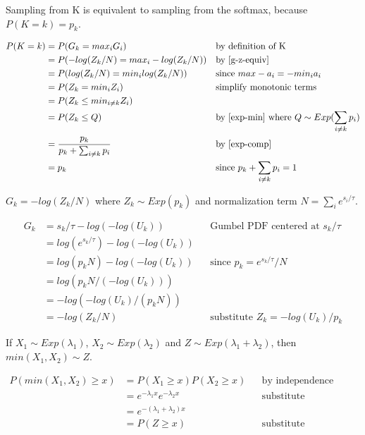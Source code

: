 \documentclass{article}
\begin{document}
\begin{theorem}
Sampling from K is equivalent to sampling from the softmax, because $P(K=k) = p_k$. \cite{Medina2020DuffAD}
\end{theorem}
\begin{align*}
    P(K = k) &= P(G_k = max_i G_i) &&\text{by definition of K} \\
    &= P(-log(Z_k / N) = max_i -log(Z_k / N)) &&\text{by \ref{g-z-equiv}}\\
    &= P(log(Z_k / N) = min_i log(Z_k / N)) &&\text{since } max -a_i = -min_i a_i \\
    &= P(Z_k = min_i Z_i) &&\text{simplify monotonic terms} \\
    &= P(Z_k \leq min_{i \neq k} Z_i) \\
    &= P(Z_k \leq Q) &&\text{by \ref{exp-min} where } Q \sim Exp(\sum_{i \neq k} p_i)\\
    &= \frac{p_k}{p_k + \sum_{i \neq k} p_i}  &&\text{by \ref{exp-comp}} \\
    &= p_k &&\text{since } p_k + \sum_{i \neq k} p_i = 1
\end{align*}


\begin{lemma}
\label{g-z-equiv}
$G_k = -log(Z_k / N)$ where $Z_k \sim Exp(p_k)$ and normalization term $N = \sum_i e^{s_i / \tau}$.
\end{lemma}
\begin{align*}
    G_k &= s_k / \tau - log(-log(U_k)) &&\text{Gumbel PDF centered at } s_k / \tau \\
    &= log(e^{s_k / \tau}) - log(-log(U_k)) \\
    &= log(p_k N) - log(-log(U_k)) &&\text{since } p_k = e^{s_k / \tau} / N \\
    &= log(p_k N / (-log(U_k))) \\
    &= -log(-log(U_k) / (p_k N)) \\
    &= -log(Z_k / N) &&\text{substitute $Z_k = -log(U_k) / p_k$}
\end{align*}

\begin{lemma}
\label{exp-min}
If $X_1 \sim Exp(\lambda_1)$, $X_2 \sim Exp(\lambda_2)$ and $Z \sim Exp(\lambda_1 + \lambda_2)$, then $min(X_1, X_2) \sim Z$.
\end{lemma}
\begin{align*}
    P(min(X_1, X_2) \geq x) &= P(X_1 \geq x)P(X_2 \geq x) &&\text{by independence} \\
    &= e^{-\lambda_1x}e^{-\lambda_2x} &&\text{substitute exponential density} \\
    &= e^{-(\lambda_1 + \lambda_2)x} \\
    &= P(Z \geq x) &&\text{substitute exponential density}
\end{align*}
\end{document}
